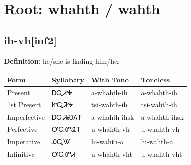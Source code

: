 \documentclass{article}%
\begin{document}
%
\normalsize%
\section*{Root: whahth / wahth}%
\subsection*{ih-vh[inf2]}%
\textbf{Definition: }%
he/she is finding him/her%
\\[0.5em]%
\begin{tabular}{|l|l|l|l|}%
\hline%
\textbf{Form}&\textbf{Syllabary}&\textbf{With Tone}&\textbf{Toneless}\\%
\hline%
Present&ᎠᏩᏗᎭ&a{-}whahth{-}ih&a{-}whahth{-}ih\\%
1st Present&ᏥᏩᏘᎭ&tsi{-}wahth{-}ih&tsi{-}wahth{-}ih\\%
Imperfective&ᎠᏩᏘᏍᎪᎢ&a{-}whahth{-}ihsk&a{-}whahth{-}ihsk\\%
Perfective&ᎤᏩᏛᎲᎢ&u{-}whahth{-}vh&u{-}whahth{-}vh\\%
Imperative&ᎯᏩᏔ&hi{-}wahth{-}a&hi{-}wahth{-}a\\%
Infinitive&ᎤᏩᏛᏗ&u{-}whahth{-}vht&u{-}whahth{-}vht\\%
\hline%
\end{tabular}%
\\[1em]%
\end{document}
